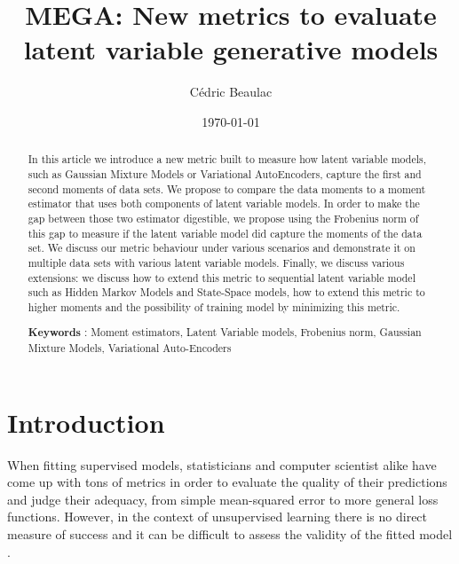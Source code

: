 \documentclass{article}
\begin{document}
\title{MEGA: New metrics to evaluate latent variable generative models}



\author{C\'edric Beaulac}


\date{\today}

\maketitle
\begin{abstract}
In this article we introduce a new metric built to measure how latent variable models, such as Gaussian Mixture Models or Variational AutoEncoders, capture the first and second moments of data sets. We propose to compare the data moments to a moment estimator that uses both components of latent variable models. In order to make the gap between those two estimator digestible, we propose using the Frobenius norm of this gap to measure if the latent variable model did capture the moments of the data set. We discuss our metric behaviour under various scenarios and demonstrate it on multiple data sets with various latent variable models. Finally, we discuss various extensions: we discuss how to extend this metric to sequential latent variable model such as Hidden Markov Models and State-Space models, how to extend this metric to higher moments and the possibility of training model by minimizing this metric.
\bigskip


\textbf{Keywords} : Moment estimators, Latent Variable models, Frobenius norm, Gaussian Mixture Models, Variational Auto-Encoders
\end{abstract}






\pagebreak


\section{Introduction} \label{intr}

When fitting supervised models, statisticians and computer scientist alike have come up with tons of metrics in order to evaluate the quality of their predictions and judge their adequacy, from simple mean-squared error to more general loss functions. However, in the context of unsupervised learning there is no direct measure of success and it can be difficult to assess the validity of the fitted model \cite{Hastie09}.
\end{document}
